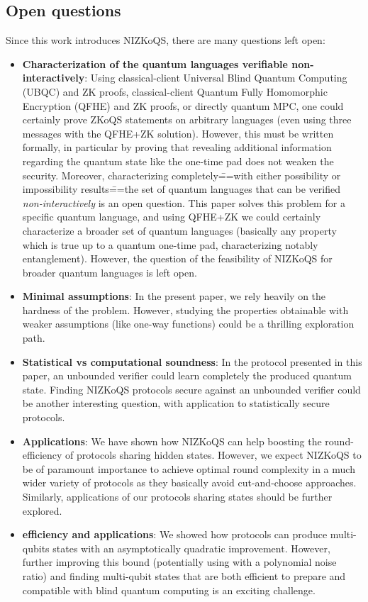 \subsection{Open questions}

Since this work introduces NIZKoQS, there are many questions left open:

\begin{itemize}
\item \textbf{Characterization of the quantum languages verifiable non-interactively}: Using classical-client Universal Blind Quantum Computing (UBQC) and ZK proofs, classical-client Quantum Fully Homomorphic Encryption (QFHE) and ZK proofs, or directly quantum MPC, one could certainly prove ZKoQS statements on arbitrary languages (even using three messages with the QFHE+ZK solution). However, this must be written formally, in particular by proving that revealing additional information regarding the quantum state like the one-time pad does not weaken the security. Moreover, characterizing completely\===with either possibility or impossibility results\===the set of quantum languages that can be verified \emph{non-interactively} is an open question. This paper solves this problem for a specific quantum language, and using QFHE+ZK we could certainly characterize a broader set of quantum languages (basically any property which is true up to a quantum one-time pad, characterizing notably entanglement). However, the question of the feasibility of NIZKoQS for broader quantum languages is left open.
\item \textbf{Minimal assumptions}: In the present paper, we rely heavily on the hardness of the \LWE{} problem. However, studying the properties obtainable with weaker assumptions (like one-way functions) could be a thrilling exploration path.
\item \textbf{Statistical vs computational soundness}: In the protocol presented in this paper, an unbounded verifier could learn completely the produced quantum state. Finding NIZKoQS protocols secure against an unbounded verifier could be another interesting question, with application to statistically secure protocols.
\item \textbf{Applications}: We have shown how NIZKoQS can help boosting the round-efficiency of protocols sharing hidden \GHZ{} states. However, we expect NIZKoQS to be of paramount importance to achieve optimal round complexity in a much wider variety of protocols as they basically avoid cut-and-choose approaches. Similarly, applications of our protocols sharing \GHZ{} states should be further explored.
\item \textbf{\RSP{} efficiency and applications}: We showed how \RSP{} protocols can produce multi-qubits states with an asymptotically quadratic improvement. However, further improving this bound (potentially using \LWE{} with a polynomial noise ratio) and finding multi-qubit states that are both efficient to prepare and compatible with blind quantum computing is an exciting challenge.
\end{itemize}


